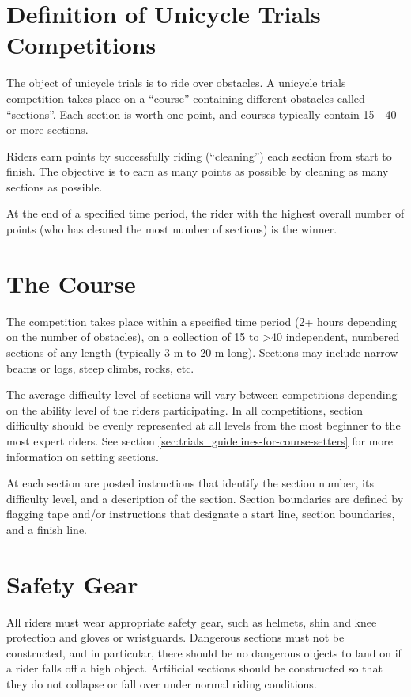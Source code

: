 
\section{Definition of Unicycle Trials Competitions}
The object of unicycle trials is to ride over obstacles. 
A unicycle trials competition takes place on a ``course'' containing different obstacles called ``sections''. 
Each section is worth one point, and courses typically contain 15 - 40 or more sections.

Riders earn points by successfully riding (``cleaning'') each section from start to finish. 
The objective is to earn as many points as possible by cleaning as many sections as possible.

At the end of a specified time period, the rider with the highest overall number of points (who has cleaned the most number of sections) is the winner.

\section{The Course}
The competition takes place within a specified time period (2+ hours depending on the number of obstacles), on a collection of 15 to >40 independent, numbered sections of any length (typically 3 m to 20 m long). 
Sections may include narrow beams or logs, steep climbs, rocks, etc.

The average difficulty level of sections will vary between competitions depending on the ability level of the riders participating. 
In all competitions, section difficulty should be evenly represented at all levels from the most beginner to the most expert riders. 
See section \ref{sec:trials_guidelines-for-course-setters} for more information on setting sections.

At each section are posted instructions that identify the section number, its difficulty level, and a description of the section.
Section boundaries are defined by flagging tape and/or instructions that designate a start line, section boundaries, and a finish line.

\section{Safety Gear}
All riders must wear appropriate safety gear, such as helmets, shin and knee protection and gloves or wristguards.
Dangerous sections must not be constructed, and in particular, there should be no dangerous objects to land on if a rider falls off a high object. 
Artificial sections should be constructed so that they do not collapse or fall over under normal riding conditions.


